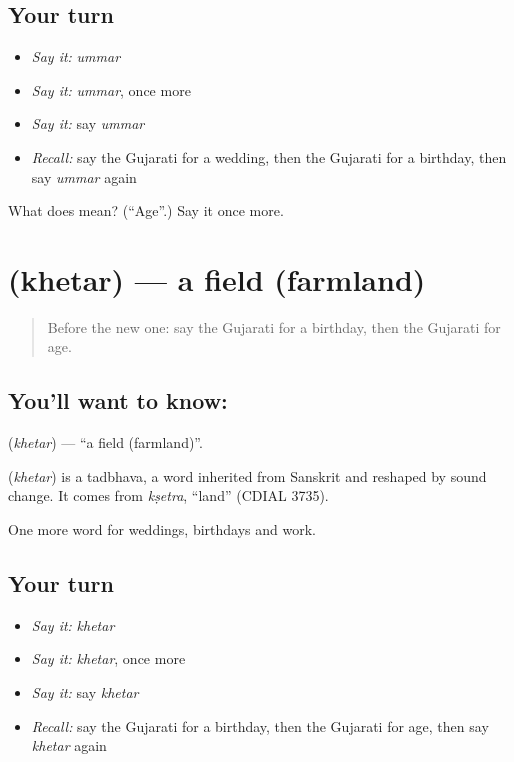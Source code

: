 \subsection*{Your turn}
\begin{itemize}
\raggedright
  \item \emph{Say it:} \emph{ummar}
  \item \emph{Say it:} \emph{ummar}, once more
  \item \emph{Say it:} say \emph{ummar}
  \item \emph{Recall:} say the Gujarati for a wedding, then the Gujarati for a birthday, then say \emph{ummar} again
\end{itemize}

\begin{tcolorbox}[breakable,colback=teal!4,colframe=teal!35!black,title={Before you move on}]
What does  mean? (\textquotedblleft{}Age\textquotedblright{}.) Say it once more.
\end{tcolorbox}
\section[\texorpdfstring{\gu{ખેતર} (khetar)}{ખેતર (khetar)}]{ (khetar) — a field (farmland)}

\label{lesson:GU-C90-field}



\begin{quote}
Before the new one: say the Gujarati for a birthday, then the Gujarati for age.
\end{quote}

\subsection*{You'll want to know: }
\textbf{} (\emph{khetar}) — \textquotedblleft{}a field (farmland)\textquotedblright{}.

\begin{cousinweb}
\textbf{} (\emph{khetar}) is a tadbhava, a word inherited from Sanskrit and reshaped by sound change. It comes from \emph{kṣetra}, \textquotedblleft{}land\textquotedblright{} (CDIAL 3735).
\end{cousinweb}

\begin{grammarlens}[title={What you've built}]
One more word for weddings, birthdays and work.
\end{grammarlens}

\subsection*{Your turn}
\begin{itemize}
\raggedright
  \item \emph{Say it:} \emph{khetar}
  \item \emph{Say it:} \emph{khetar}, once more
  \item \emph{Say it:} say \emph{khetar}
  \item \emph{Recall:} say the Gujarati for a birthday, then the Gujarati for age, then say \emph{khetar} again
\end{itemize}

